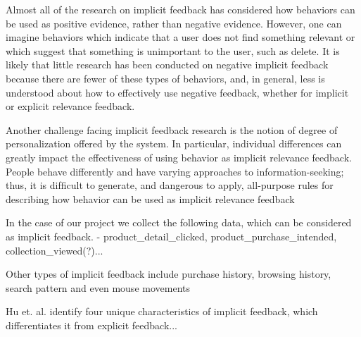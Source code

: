 Almost all of the research on implicit feedback has considered how behaviors can
be used as positive evidence, rather than negative evidence. However, one can imagine
behaviors which indicate that a user does not ﬁnd something relevant or which suggest
that something is unimportant to the user, such as delete. It is likely that little research
has been conducted on negative implicit feedback because there are fewer of these types
of behaviors, and, in general, less is understood about how to effectively use negative
feedback, whether for implicit or explicit relevance feedback.

Another challenge facing implicit feedback research is the notion of degree of
personalization offered by the system. In particular, individual differences can greatly
impact the effectiveness of using behavior as implicit relevance feedback. People behave
differently and have varying approaches to information-seeking; thus, it is difﬁcult to
generate, and dangerous to apply, all-purpose rules for describing how behavior can be
used as implicit relevance feedback


In the case of our project we collect the following data, which can be considered as implicit feedback.
- product\_detail\_clicked, product\_purchase\_intended, collection\_viewed(?)...

Other types of implicit feedback include purchase history, browsing
history, search pattern and even mouse movements

Hu et. al. \cite{Hu2008} identify four unique characteristics of implicit feedback, which differentiates it from explicit feedback...

